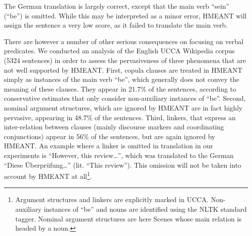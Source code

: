 \documentclass[11pt,letterpaper]{article}
\newcommand{\com}[1]{}
\def\equo#1{``{#1}''}  %
\begin{document}

The German translation 
is largely correct, except that the main verb ``sein'' (``be'') is omitted.
While this may be interpreted as a minor error, HMEANT will assign the
sentence a very low score, as it failed to translate the main verb.



\com{
}

There are however a number of other serious consequences on focusing on verbal
predicates. We conducted an analysis of the English UCCA Wikipedia
corpus (5324 sentences) in order to assess the pervasiveness of three phenomena that are not
well supported by HMEANT.
First, copula clauses are treated in HMEANT simply as instances of the main verb ``be'', which
generally does not convey the meaning of these clauses. They appear in 21.7\% of the sentences,
according to conservative estimates that only consider non-auxiliary instances of ``be''.
Second, nominal argument structures, which are ignored by  HMEANT are in fact highly
pervasive, appearing in 48.7\% of the sentences.
Third, linkers, that express an inter-relation between
clauses (mainly discourse markers and coordinating conjunctions) appear in 56\% of the
sentences, but are again ignored by HMEANT.
An example where a linker is omitted in translation in our experiments is
\equo{However, this review\dots}, which was translated to
the German \equo{Diese \"Uberpr\"ufung\dots} (lit. \equo{This review}).
This omission will not be taken into account by HMEANT at all\footnote{Argument structures and linkers are explicitly marked in UCCA. Non-auxiliary instances of ``be'' and nouns are identified using the NLTK standard tagger. Nominal argument structures are here Scenes whose main relation is headed by a noun.}.
\end{document}
